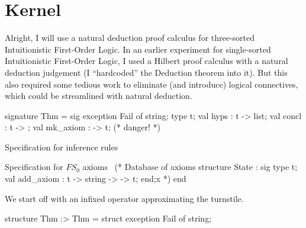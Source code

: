 
\section{Kernel}

\begin{node}
Alright, I will use a natural deduction proof calculus for
three-sorted Intuitionistic First-Order Logic. In an earlier
experiment for single-sorted Intuitionistic First-Order Logic, I used
a Hilbert proof calculus with a natural deduction judgement (I
``hardcoded'' the Deduction theorem into it). But this also required
some tedious work to eliminate (and introduce) logical connectives,
which could be streamlined with natural deduction.
\end{node}

\nwenddocs{}\endmoddef\nwstartdeflinemarkup\nwenddeflinemarkup
signature Thm = sig
  exception Fail of string;
  type t;
  val hyps : t ->  list;
  val concl : t -> ;
  val mk_axiom :  -> t; (* danger! *)

  \LA{}Specification for inference rules~{\nwtagstyle{}}\RA{}

  \LA{}Specification for $FS_{0}$ axioms~{\nwtagstyle{}}\RA{}
  (* Database of axioms
  structure State : sig
              type t;
              val add_axiom : t -> string ->  -> t;
            end;x
   *)
end
\nwendcode{}\nwdocspar

\begin{node}
We start off with an infixed operator approximating the turnstile.
\end{node}

\nwenddocs{}\endmoddef\nwstartdeflinemarkup\nwenddeflinemarkup
structure Thm :> Thm = struct
exception Fail of string;

